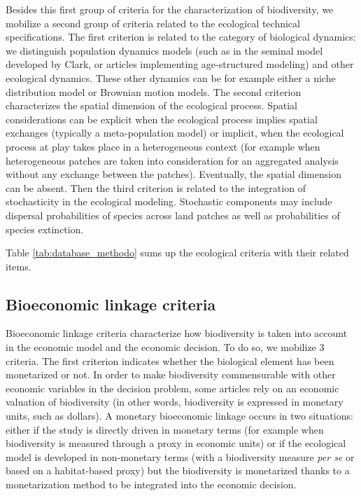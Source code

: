Besides this first group of criteria for the characterization of biodiversity, we mobilize a second group of criteria related to the ecological technical specifications. The first criterion is related to the category of biological dynamics: we distinguish population dynamics models (such as in the seminal model developed by Clark, or articles implementing age-structured modeling) and other ecological dynamics. These other dynamics can be for example either a niche distribution model or Brownian motion models. The second criterion characterizes the spatial dimension of the ecological process. Spatial considerations can be explicit when the ecological process implies spatial exchanges (typically a meta-population  model) or implicit, when the ecological process at play takes place in a heterogeneous context (for example when heterogeneous patches are taken into consideration for an aggregated analysis without any exchange between the patches). Eventually, the spatial dimension can be absent. Then the third criterion is related to the integration of stochasticity in the ecological modeling. Stochastic components may include dispersal probabilities of species across land patches as well as probabilities of species extinction.

Table \ref{tab:database_methodo} sums up the ecological criteria with their related items.

\subsection{Bioeconomic linkage criteria}

 Bioeconomic linkage criteria characterize how biodiversity is taken into account in the economic model and the economic decision. To do so, we mobilize 3 criteria. 
 The first criterion indicates whether the biological element has been monetarized or not. In order to make biodiversity commensurable with other economic variables in the decision problem, some articles rely on an economic valuation of biodiversity (in other words, biodiversity is expressed in monetary units, such as dollars). A monetary bioeconomic linkage occurs in two situations: either if the study is directly driven in monetary terms (for example when biodiversity is measured through a proxy in economic units) or if the ecological model is developed in non-monetary terms (with a biodiversity measure \textit{per se} or based on a habitat-based proxy) but the biodiversity is monetarized thanks to a monetarization method to be integrated into the economic decision.

